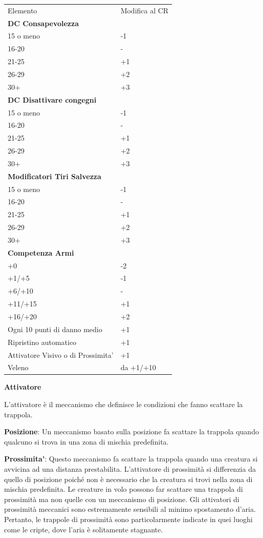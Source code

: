 \documentclass[a4paper,11pt,twoside,openany]{book}
\begin{document}
\begin{tabular}{ll}
	\toprule
	Elemento   & Modifica al CR\tabularnewline
	\textbf{DC Consapevolezza}& \\
	15 o meno  & -1   \\
	16-20 & -    \\
	21-25 & +1   \\
	26-29 & +2   \\
	30+   & +3   \\
	\textbf{DC Disattivare congegni}
	 & \\
	15 o meno  & -1   \\
	16-20 & -    \\
	21-25 & +1   \\
	26-29 & +2   \\
	30+   & +3   \\
	\textbf{Modificatori Tiri Salvezza} & \\
	15 o meno  & -1   \\
	16-20 & -    \\
	21-25 & +1   \\
	26-29 & +2   \\
	30+   & +3   \\
	\textbf{Competenza Armi}  & \\
	+0    & -2   \\
	+1/+5 & -1   \\
	+6/+10& -    \\
	+11/+15    & +1   \\
	+16/+20    & +2   \\

	Ogni 10 punti di danno medio   & +1   \\
	Ripristino automatico& +1   \\
	Attivatore Visivo o di Prossimita’  & +1   \\
	Veleno& da +1/+10 \\
\end{tabular}

\bigskip

\textbf{Attivatore}

L'attivatore è il meccanismo che definisce le condizioni che fanno scattare la trappola.

\textbf{Posizione}: Un meccanismo basato sulla posizione fa scattare la trappola quando qualcuno si trova in una zona di mischia predefinita.

\textbf{Prossimita'}: Questo meccanismo fa scattare la trappola quando una creatura si avvicina ad una distanza prestabilita. L'attivatore di prossimità si differenzia da quello di posizione poiché non è necessario che la creatura si trovi nella zona di mischia predefinita. Le creature in volo possono far scattare una trappola di prossimità ma non quelle con un meccanismo di posizione. Gli attivatori di prossimità meccanici sono estremamente sensibili al minimo spostamento d'aria. Pertanto, le trappole di prossimità sono particolarmente indicate in quei luoghi come le cripte, dove l'aria è solitamente stagnante.
\end{document}
